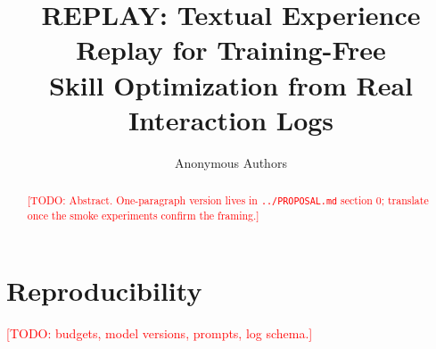 \documentclass[11pt]{article}
\title{REPLAY: Textual Experience Replay for Training-Free\\Skill Optimization from Real Interaction Logs}
\author{
  Anonymous Authors\\
  \todo{author list}
}
\date{}
\newcommand{\todo}[1]{\textcolor{red}{[TODO: #1]}}
\begin{document}
\maketitle

\begin{abstract}
\todo{Abstract. One-paragraph version lives in \texttt{../PROPOSAL.md} section 0; translate once the smoke experiments confirm the framing.}
\end{abstract}










\appendix
\section{Reproducibility}
\todo{budgets, model versions, prompts, log schema.}
\end{document}
